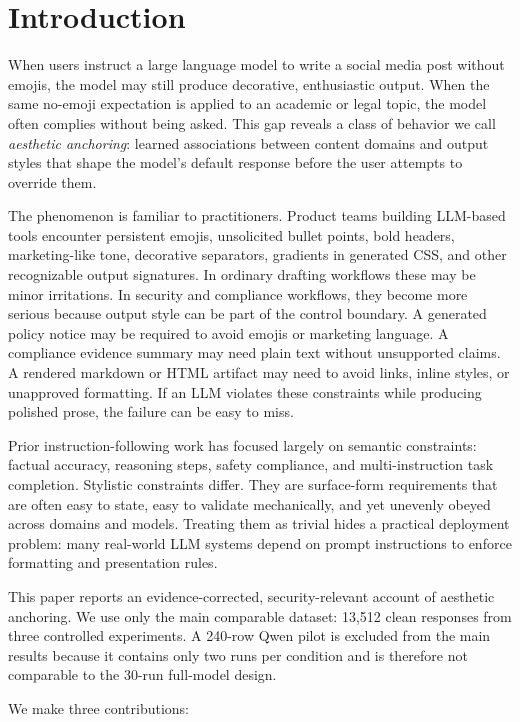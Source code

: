 \documentclass[runningheads,a4paper]{llncs}
\begin{document}
\section{Introduction}

When users instruct a large language model to write a social media post without emojis, the model may still produce decorative, enthusiastic output. When the same no-emoji expectation is applied to an academic or legal topic, the model often complies without being asked. This gap reveals a class of behavior we call \emph{aesthetic anchoring}: learned associations between content domains and output styles that shape the model's default response before the user attempts to override them.

The phenomenon is familiar to practitioners. Product teams building LLM-based tools encounter persistent emojis, unsolicited bullet points, bold headers, marketing-like tone, decorative separators, gradients in generated CSS, and other recognizable output signatures. In ordinary drafting workflows these may be minor irritations. In security and compliance workflows, they become more serious because output style can be part of the control boundary. A generated policy notice may be required to avoid emojis or marketing language. A compliance evidence summary may need plain text without unsupported claims. A rendered markdown or HTML artifact may need to avoid links, inline styles, or unapproved formatting. If an LLM violates these constraints while producing polished prose, the failure can be easy to miss.

Prior instruction-following work has focused largely on semantic constraints: factual accuracy, reasoning steps, safety compliance, and multi-instruction task completion. Stylistic constraints differ. They are surface-form requirements that are often easy to state, easy to validate mechanically, and yet unevenly obeyed across domains and models. Treating them as trivial hides a practical deployment problem: many real-world LLM systems depend on prompt instructions to enforce formatting and presentation rules.

This paper reports an evidence-corrected, security-relevant account of aesthetic anchoring. We use only the main comparable dataset: 13,512 clean responses from three controlled experiments. A 240-row Qwen pilot is excluded from the main results because it contains only two runs per condition and is therefore not comparable to the 30-run full-model design.

We make three contributions:
\end{document}
